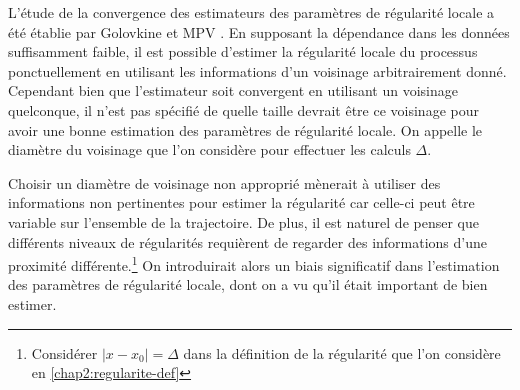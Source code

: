 
L'étude de la convergence des estimateurs des paramètres de régularité locale a été établie par Golovkine et MPV \cite{golovkineRegularityOnlineEstimationNoisyCurve,maissoro-SmoothnessFTSweakDep}. En supposant la dépendance dans les données suffisamment faible, il est possible d'estimer la régularité locale du processus ponctuellement en utilisant les informations d'un voisinage arbitrairement donné. Cependant bien que l'estimateur soit convergent en utilisant un voisinage quelconque, il n'est pas spécifié de quelle taille devrait être ce voisinage pour avoir une bonne estimation des paramètres de régularité locale. On appelle le diamètre du voisinage que l'on considère pour effectuer les calculs $\Delta$.


Choisir un diamètre de voisinage non approprié mènerait à utiliser des informations non pertinentes pour estimer la régularité car celle-ci peut être variable sur l'ensemble de la trajectoire. De plus, il est naturel de penser que différents niveaux de régularités requièrent de regarder des informations d'une proximité différente.\footnote{Considérer $|x-x_0| = \Delta$ dans la définition de la régularité que l'on considère en \ref{chap2:regularite-def} } On introduirait alors un biais significatif dans l'estimation des paramètres de régularité locale, dont on a vu qu'il était important de bien estimer.
